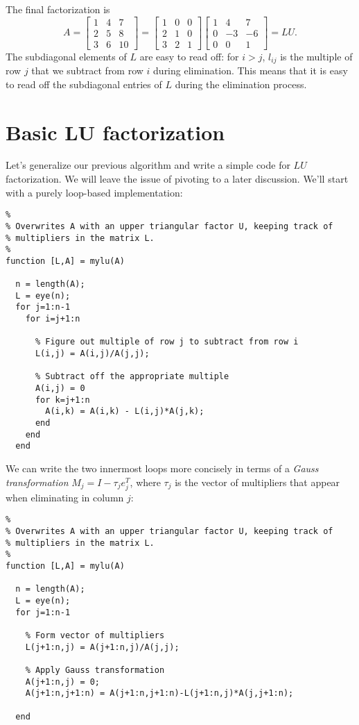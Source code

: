 \documentclass[12pt, leqno]{article}
\begin{document}
The final factorization is
\[
A =
\begin{bmatrix} 1 & 4 & 7 \\ 2 & 5 & 8 \\ 3 & 6 & 10 \end{bmatrix} =
\begin{bmatrix} 1 & 0 & 0 \\ 2 & 1 & 0 \\ 3 & 2 & 1 \end{bmatrix}
\begin{bmatrix} 1 & 4 & 7 \\ 0 & -3 & -6 \\ 0 & 0 & 1 \end{bmatrix} = LU.
\]
The subdiagonal elements of $L$ are easy to read off: for $i > j$, 
$l_{ij}$ is the multiple of row $j$ that we subtract from row
$i$ during elimination.  This means that it is easy to read off the
subdiagonal entries of $L$ during the elimination process.

\section{Basic LU factorization}

Let's generalize our previous algorithm and write a simple code for
$LU$ factorization.  We will leave the issue of pivoting to a later
discussion.  We'll start with a purely loop-based implementation:
\begin{lstlisting}
%
% Overwrites A with an upper triangular factor U, keeping track of
% multipliers in the matrix L.
%
function [L,A] = mylu(A)

  n = length(A);
  L = eye(n);
  for j=1:n-1
    for i=j+1:n

      % Figure out multiple of row j to subtract from row i
      L(i,j) = A(i,j)/A(j,j);

      % Subtract off the appropriate multiple
      A(i,j) = 0
      for k=j+1:n
        A(i,k) = A(i,k) - L(i,j)*A(j,k);
      end
    end
  end
\end{lstlisting}
We can write the two innermost loops more concisely in
terms of a {\em Gauss transformation} $M_j = I - \tau_j e_j^T$,
where $\tau_j$ is the vector of multipliers that appear when
eliminating in column $j$:
\begin{lstlisting}
%
% Overwrites A with an upper triangular factor U, keeping track of
% multipliers in the matrix L.
%
function [L,A] = mylu(A)

  n = length(A);
  L = eye(n);
  for j=1:n-1

    % Form vector of multipliers
    L(j+1:n,j) = A(j+1:n,j)/A(j,j);

    % Apply Gauss transformation
    A(j+1:n,j) = 0;
    A(j+1:n,j+1:n) = A(j+1:n,j+1:n)-L(j+1:n,j)*A(j,j+1:n);

  end
\end{lstlisting}
\end{document}
